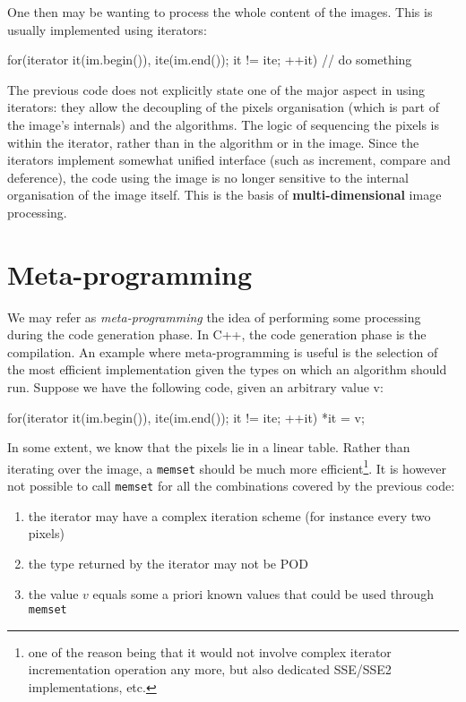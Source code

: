 \documentclass[a4paper, fleqn, 10pt]{book}
\theoremstyle{break}
\begin{document}
One then may be wanting to process the whole content of the images. This is usually implemented using iterators:
\begin{cpp}
for(iterator it(im.begin()), ite(im.end()); it != ite; ++it)
{
  // do something
}
\end{cpp}

The previous code does not explicitly state one of the major aspect in using iterators: they allow the decoupling of the pixels organisation (which is part of the image's internals) and the algorithms. The logic of sequencing the pixels is within the iterator, rather than in the algorithm or in the image. Since the iterators implement somewhat unified interface (such as increment, compare and deference), the code using the image is no longer sensitive to the internal organisation of the image itself. 
This is the basis of \textbf{multi-dimensional} image processing.



\section{Meta-programming}
We may refer as \textit{meta-programming} the idea of performing some processing during the code generation phase. In C++, the code generation phase is the compilation.
An example where meta-programming is useful is the selection of the most efficient implementation given the types on which an algorithm should run. Suppose we have the following code, given an arbitrary value v:

\begin{cpp}
for(iterator it(im.begin()), ite(im.end()); it != ite; ++it)
{
  *it = v;
}
\end{cpp}

In some extent, we know that the pixels lie in a linear table. Rather than iterating over the image, a \lstinline|memset| should be much more efficient\footnote{one of the reason being that it would not involve complex iterator incrementation operation any more, but also dedicated SSE/SSE2 implementations, etc.}. It is however not possible to call \lstinline|memset| for all the combinations covered by the previous code:
\begin{enumerate}
\item the iterator may have a complex iteration scheme (for instance every two pixels)
\item the type returned by the iterator may not be POD
\item the value $v$ equals some a priori known values that could be used through \lstinline|memset|
\end{enumerate}
\end{document}

